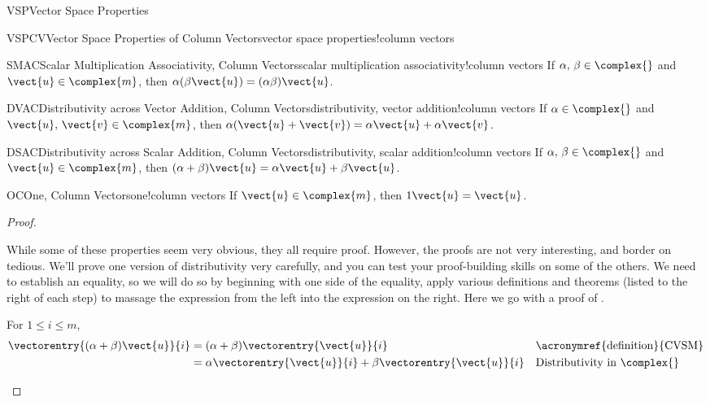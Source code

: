 \begin{subsect}{VSP}{Vector Space Properties}
\begin{theorem}{VSPCV}{Vector Space Properties of Column Vectors}{vector space properties!column vectors}
\begin{para}
\begin{propertylist}
%
\begin{property}{SMAC}{Scalar Multiplication Associativity, Column Vectors}{scalar multiplication associativity!column vectors}
If $\alpha,\,\beta\in\complex{\null}$ and $\vect{u}\in\complex{m}$, then $\alpha(\beta\vect{u})=(\alpha\beta)\vect{u}$.\end{property}
%
\begin{property}{DVAC}{Distributivity across Vector Addition, Column Vectors}{distributivity, vector addition!column vectors}
If $\alpha\in\complex{\null}$ and $\vect{u},\,\vect{v}\in\complex{m}$, then $\alpha(\vect{u}+\vect{v})=\alpha\vect{u}+\alpha\vect{v}$.\end{property}
%
\begin{property}{DSAC}{Distributivity across Scalar Addition, Column Vectors}{distributivity, scalar addition!column vectors}
If $\alpha,\,\beta\in\complex{\null}$ and $\vect{u}\in\complex{m}$, then
$(\alpha+\beta)\vect{u}=\alpha\vect{u}+\beta\vect{u}$.\end{property}
%
\begin{property}{OC}{One, Column Vectors}{one!column vectors}
If $\vect{u}\in\complex{m}$, then $1\vect{u}=\vect{u}$.\end{property}
%
\end{propertylist}
\end{para}
\end{theorem}
%
\begin{proof}
\begin{para}
While some of these properties seem very obvious, they all require proof.  However, the proofs are not very interesting, and border on tedious. We'll prove one version of distributivity very carefully, and you can test your proof-building skills on some of the others.  We need to establish an equality, so we will do so by beginning with one side of the equality, apply various definitions and theorems (listed to the right of each step) to massage the expression from the left into the expression on the right.   Here we go with a proof of .\end{para}
%
\begin{para}For $1\leq i\leq m$,
%
\begin{align*}
\vectorentry{(\alpha+\beta)\vect{u}}{i}
&=(\alpha+\beta)\vectorentry{\vect{u}}{i}
&&\text{\acronymref{definition}{CVSM}}\\
%
&=\alpha\vectorentry{\vect{u}}{i}+\beta\vectorentry{\vect{u}}{i}
&&\text{Distributivity in $\complex{\null}$}\\

\end{align*}
\end{para}
\end{proof}
\end{subsect}
